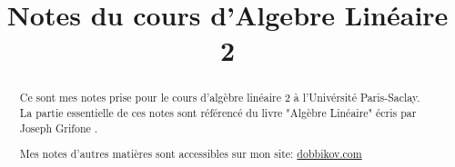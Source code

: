 \documentclass[a4paper]{report}
\title{Notes du cours d'Algebre Linéaire 2}
\begin{document}
\maketitle
\begin{abstract}
    Ce sont mes notes prise pour le cours d'algèbre linéaire 2 à l'Univérsité Paris-Saclay. La partie essentielle de ces notes sont référencé du livre "Algèbre Linéaire" écris par Joseph Grifone \cite{grifone}.

   Mes notes d'autres matières sont accessibles sur mon site: \href{https://dobbikov.com/lecture_notes}{dobbikov.com}
\end{abstract}
\tableofcontents











\nocite{*}
\printbibliography
\end{document}
